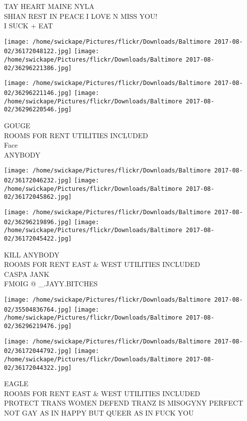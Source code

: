 \documentclass[10pt,letterpaper]{article}
\begin{document}
TAY HEART MAINE NYLA\\
SHIAN REST IN PEACE I LOVE N MISS YOU!\\
I SUCK + EAT
\pagebreak

\texttt{[image: /home/swickape/Pictures/flickr/Downloads/Baltimore 2017-08-02/36172048122.jpg]}
\texttt{[image: /home/swickape/Pictures/flickr/Downloads/Baltimore 2017-08-02/36296221386.jpg]}

\texttt{[image: /home/swickape/Pictures/flickr/Downloads/Baltimore 2017-08-02/36296221146.jpg]}
\texttt{[image: /home/swickape/Pictures/flickr/Downloads/Baltimore 2017-08-02/36296220546.jpg]}

GOUGE\\
ROOMS FOR RENT UTILITIES INCLUDED\\
Face\\
ANYBODY
\pagebreak

\texttt{[image: /home/swickape/Pictures/flickr/Downloads/Baltimore 2017-08-02/36172046232.jpg]}
\texttt{[image: /home/swickape/Pictures/flickr/Downloads/Baltimore 2017-08-02/36172045862.jpg]}

\texttt{[image: /home/swickape/Pictures/flickr/Downloads/Baltimore 2017-08-02/36296219896.jpg]}
\texttt{[image: /home/swickape/Pictures/flickr/Downloads/Baltimore 2017-08-02/36172045422.jpg]}

KILL ANYBODY\\
ROOMS FOR RENT EAST \& WEST UTILITIES INCLUDED\\
CASPA JANK\\
FMOIG @ \_.JAYY.BITCHES
\pagebreak

\texttt{[image: /home/swickape/Pictures/flickr/Downloads/Baltimore 2017-08-02/35504836764.jpg]}
\texttt{[image: /home/swickape/Pictures/flickr/Downloads/Baltimore 2017-08-02/36296219476.jpg]}

\texttt{[image: /home/swickape/Pictures/flickr/Downloads/Baltimore 2017-08-02/36172044792.jpg]}
\texttt{[image: /home/swickape/Pictures/flickr/Downloads/Baltimore 2017-08-02/36172044322.jpg]}

EAGLE\\
ROOMS FOR RENT EAST \& WEST UTILITIES INCLUDED\\
PROTECT TRANS WOMEN DEFEND TRANZ IS MISOGYNY PERFECT\\
NOT GAY AS IN HAPPY BUT QUEER AS IN FUCK YOU
\pagebreak
\end{document}
